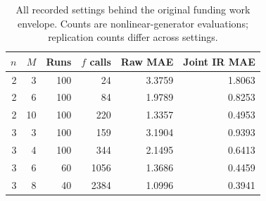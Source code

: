 \begin{table}[htbp]
\centering\small
\caption{All recorded settings behind the original funding work envelope. Counts are nonlinear-generator evaluations; replication counts differ across settings.}\label{tab:restored-funding-budget}
\begin{tabular}{rrrrrr}
\toprule
$n$ & $M$ & Runs & $f$ calls & Raw MAE & Joint IR MAE \\
\midrule
2 & 3 & 100 & 24 & 3.3759 & 1.8063 \\
2 & 6 & 100 & 84 & 1.9789 & 0.8253 \\
2 & 10 & 100 & 220 & 1.3357 & 0.4953 \\
3 & 3 & 100 & 159 & 3.1904 & 0.9393 \\
3 & 4 & 100 & 344 & 2.1495 & 0.6413 \\
3 & 6 & 60 & 1056 & 1.3686 & 0.4459 \\
3 & 8 & 40 & 2384 & 1.0996 & 0.3941 \\
\bottomrule
\end{tabular}
\end{table}
